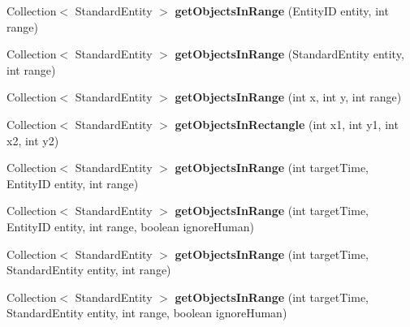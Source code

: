\begin{DoxyCompactItemize}
Collection$<$ Standard\+Entity $>$ {\bfseries get\+Objects\+In\+Range} (Entity\+ID entity, int range)
\item 
\hypertarget{classadf_1_1agent_1_1info_1_1WorldInfo_a4e6a7052c017b3f4acb2d113e1cbbc68}{}\label{classadf_1_1agent_1_1info_1_1WorldInfo_a4e6a7052c017b3f4acb2d113e1cbbc68} 
Collection$<$ Standard\+Entity $>$ {\bfseries get\+Objects\+In\+Range} (Standard\+Entity entity, int range)
\item 
\hypertarget{classadf_1_1agent_1_1info_1_1WorldInfo_a88fb79771a08d8698de558cc86a07c55}{}\label{classadf_1_1agent_1_1info_1_1WorldInfo_a88fb79771a08d8698de558cc86a07c55} 
Collection$<$ Standard\+Entity $>$ {\bfseries get\+Objects\+In\+Range} (int x, int y, int range)
\item 
\hypertarget{classadf_1_1agent_1_1info_1_1WorldInfo_a418983aecfad6a8a0a2eff0aada5fcda}{}\label{classadf_1_1agent_1_1info_1_1WorldInfo_a418983aecfad6a8a0a2eff0aada5fcda} 
Collection$<$ Standard\+Entity $>$ {\bfseries get\+Objects\+In\+Rectangle} (int x1, int y1, int x2, int y2)
\item 
\hypertarget{classadf_1_1agent_1_1info_1_1WorldInfo_aeefd103c2397ce537939d3b260fc06f7}{}\label{classadf_1_1agent_1_1info_1_1WorldInfo_aeefd103c2397ce537939d3b260fc06f7} 
Collection$<$ Standard\+Entity $>$ {\bfseries get\+Objects\+In\+Range} (int target\+Time, Entity\+ID entity, int range)
\item 
\hypertarget{classadf_1_1agent_1_1info_1_1WorldInfo_a7b8679a77b451d562805f36a205f5916}{}\label{classadf_1_1agent_1_1info_1_1WorldInfo_a7b8679a77b451d562805f36a205f5916} 
Collection$<$ Standard\+Entity $>$ {\bfseries get\+Objects\+In\+Range} (int target\+Time, Entity\+ID entity, int range, boolean ignore\+Human)
\item 
\hypertarget{classadf_1_1agent_1_1info_1_1WorldInfo_a22ea642eb2c26381c6582d7de5237c62}{}\label{classadf_1_1agent_1_1info_1_1WorldInfo_a22ea642eb2c26381c6582d7de5237c62} 
Collection$<$ Standard\+Entity $>$ {\bfseries get\+Objects\+In\+Range} (int target\+Time, Standard\+Entity entity, int range)
\item 
\hypertarget{classadf_1_1agent_1_1info_1_1WorldInfo_a01ff4819e85f9121b9eea2eb7f33dcd9}{}\label{classadf_1_1agent_1_1info_1_1WorldInfo_a01ff4819e85f9121b9eea2eb7f33dcd9} 
Collection$<$ Standard\+Entity $>$ {\bfseries get\+Objects\+In\+Range} (int target\+Time, Standard\+Entity entity, int range, boolean ignore\+Human)
\item 
\hypertarget{classadf_1_1agent_1_1info_1_1WorldInfo_a07ad2871c9d3ba567a335d4650ec3e95}{}\label{classadf_1_1agent_1_1info_1_1WorldInfo_a07ad2871c9d3ba567a335d4650ec3e95} 

\end{DoxyCompactItemize}
